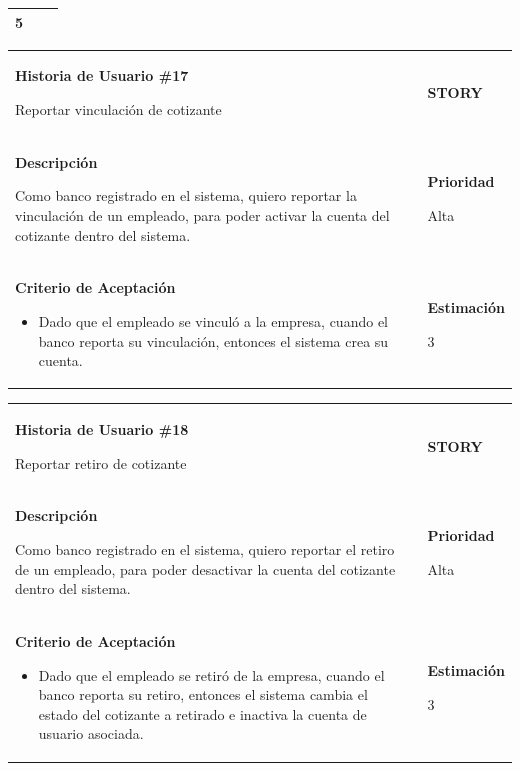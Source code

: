 \documentclass[12pt,a4paper]{article}
\begin{document}
\begin{center}
\begin{tabular}{|>{\columncolor[RGB]{215, 215, 215}} p{10cm} >{\columncolor[RGB]{215, 215, 215}} c >{\columncolor[RGB]{215, 215, 215}} p{2.5cm}|}
5 \\ 
\hline 
\end{tabular}
\vspace{5mm}

\begin{tabular}{| p{10cm} c p{2.5cm}|}
\hline 
\textbf{Historia de Usuario \#17}

Reportar vinculación de cotizante & & \textbf{{\Large STORY}} \\ 
\textbf{Descripción}

Como banco registrado en el sistema, quiero reportar la vinculación de
un empleado, para poder activar la cuenta del cotizante dentro del
sistema. &  & \textbf{Prioridad}

Alta\\

\textbf{Criterio de Aceptación}

\begin{itemize}
\item Dado que el empleado se vinculó a la empresa, cuando el banco
reporta su vinculación, entonces el sistema crea su cuenta.
\end{itemize} & & \textbf{Estimación}

3 \\ 
\hline 
\end{tabular}
\vspace{5mm}

\begin{tabular}{| p{10cm} c p{2.5cm}|}
\hline 
\textbf{Historia de Usuario \#18}

Reportar retiro de cotizante & & \textbf{{\Large STORY}} \\ 
\textbf{Descripción}

Como banco registrado en el sistema, quiero reportar el retiro de un
empleado, para poder desactivar la cuenta del cotizante dentro del
sistema. &  & \textbf{Prioridad}

Alta\\

\textbf{Criterio de Aceptación}

\begin{itemize}
\item Dado que el empleado se retiró de la empresa, cuando el banco
reporta su retiro, entonces el sistema cambia el estado del
cotizante a retirado e inactiva la cuenta de usuario asociada.
\end{itemize} & & \textbf{Estimación}

3 \\ 
\hline 
\end{tabular}
\vspace{5mm}


\end{center}
\end{document}
